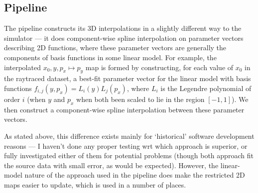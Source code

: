 
\subsection{Pipeline}

The pipeline constructs its 3D interpolations in a slightly
different way to the simulator --- it does component-wise spline interpolation
on parameter vectors describing 2D functions, where these parameter vectors
are generally the components of basis functions in some linear model.
For example, the interpolated $x_0, y, p_x \mapsto p_y$ map is formed by
constructing, for each value of $x_0$ in the raytraced dataset, a best-fit
parameter vector for the linear model with basis functions $f_{i,j}(y, p_x) = L_i (y) L_j (p_x)$, where $L_i$ is the Legendre polynomial of order $i$ (when $y$
and $p_x$ when both been scaled to lie in the region $[-1,1]$). We then construct
a component-wise spline interpolation between these parameter vectors.

As stated above, this difference exists mainly for `historical' software development
reasons --- I haven't done any proper testing wrt which approach is superior, or
fully investigated either of them for potential problems (though both approach
fit the source data with small error, as would be expected). However, the linear-model
nature of the approach used in the pipeline does make the restricted 2D maps easier to update,
which is used in a number of places.
